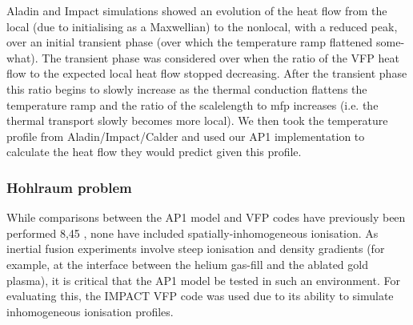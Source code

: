 Aladin and Impact simulations showed an evolution of the heat flow
from the local (due to initialising as a Maxwellian) to the
nonlocal, with a reduced peak, over an initial transient
phase (over which the temperature ramp flattened some-
what). The transient phase was considered over when the
ratio of the VFP heat flow to the expected local heat
flow stopped decreasing. After the transient phase this
ratio begins to slowly increase as the thermal conduction flattens 
the temperature ramp and the ratio of the scalelength to mfp increases 
(i.e. the thermal transport slowly becomes more local). 
We then took the temperature profile from Aladin/Impact/Calder and used 
our AP1 implementation to calculate the heat flow
they would predict given this profile.

\subsubsection{Hohlraum problem}
While comparisons between the AP1 model and VFP
codes have previously been performed 8,45 , none have included 
spatially-inhomogeneous ionisation. As inertial
fusion experiments involve steep ionisation and density
gradients (for example, at the interface between the helium gas-fill and 
the ablated gold plasma), it is critical that the AP1 model be tested 
in such an environment.
For evaluating this, the IMPACT \cite{Kingham_JCP2004} VFP code was used
due to its ability to simulate inhomogeneous ionisation profiles.

